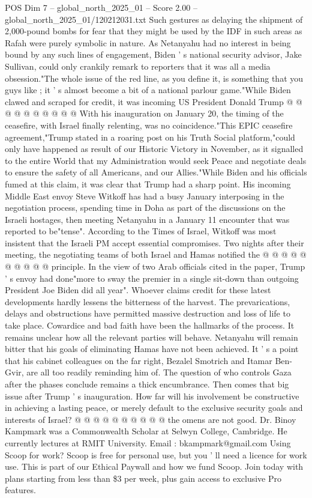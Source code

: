 \begin{textsample}{POS Dim 7 – global\_north\_2025\_01 – Score 2.00 – global\_north\_2025\_01/120212031.txt}
Such gestures as delaying the shipment of 2,000-pound bombs for fear that they might be used by the IDF in such areas as Rafah were purely symbolic in nature.
As Netanyahu had no interest in being bound by any such lines of engagement, Biden ' s national security advisor, Jake Sullivan, could only crankily remark to reporters that it was all a media obsession."The whole issue of the red line, as you define it, is something that you guys like ; it ' s almost become a bit of a national parlour game."While Biden clawed and scraped for credit, it was incoming US President Donald Trump @ @ @ @ @ @ @ @ @ @ With his inauguration on January 20, the timing of the ceasefire, with Israel finally relenting, was no coincidence."This EPIC ceasefire agreement,"Trump stated in a roaring post on his Truth Social platform,"could only have happened as result of our Historic Victory in November, as it signalled to the entire World that my Administration would seek Peace and negotiate deals to ensure the safety of all Americans, and our Allies."While Biden and his officials fumed at this claim, it was clear that Trump had a sharp point.
His incoming Middle East envoy Steve Witkoff has had a busy January interposing in the negotiation process, spending time in Doha as part of the discussions on the Israeli hostages, then meeting Netanyahu in a January 11 encounter that was reported to be"tense".
According to the Times of Israel, Witkoff was most insistent that the Israeli PM accept essential compromises.
Two nights after their meeting, the negotiating teams of both Israel and Hamas notified the @ @ @ @ @ @ @ @ @ @ principle.
In the view of two Arab officials cited in the paper, Trump ' s envoy had done"more to sway the premier in a single sit-down than outgoing President Joe Biden did all year".
Whoever claims credit for these latest developments hardly lessens the bitterness of the harvest.
The prevarications, delays and obstructions have permitted massive destruction and loss of life to take place.
Cowardice and bad faith have been the hallmarks of the process.
It remains unclear how all the relevant parties will behave.
Netanyahu will remain bitter that his goals of eliminating Hamas have not been achieved.
It ' s a point that his cabinet colleagues on the far right, Bezalel Smotrich and Itamar Ben-Gvir, are all too readily reminding him of.
The question of who controls Gaza after the phases conclude remains a thick encumbrance.
Then comes that big issue after Trump ' s inauguration.
How far will his involvement be constructive in achieving a lasting peace, or merely default to the exclusive security goals and interests of Israel? @ @ @ @ @ @ @ @ @ @ the omens are not good.
Dr.
Binoy Kampmark was a Commonwealth Scholar at Selwyn College, Cambridge.
He currently lectures at RMIT University.
Email : bkampmark@gmail.com Using Scoop for work?
Scoop is free for personal use, but you ' ll need a licence for work use.
This is part of our Ethical Paywall and how we fund Scoop.
Join today with plans starting from less than \$3 per week, plus gain access to exclusive Pro features.

\end{textsample}
